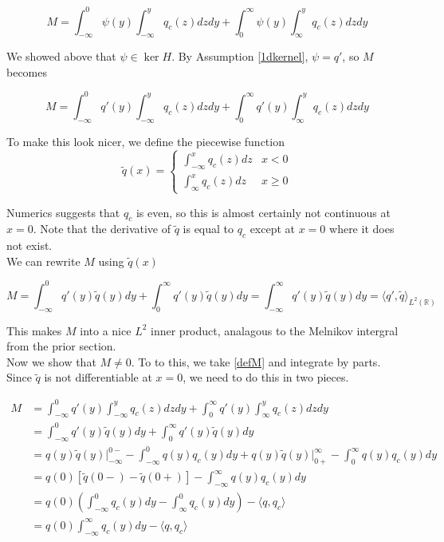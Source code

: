 \documentclass[12pt]{article}
\def\R{{\mathbb R}}
\begin{document}
\begin{equation}
M = \int_{-\infty}^0 \psi(y) \int_{-\infty}^y q_c(z) dz dy + \int_0^\infty \psi(y) \int_{\infty}^y q_c(z) dz dy 
\end{equation}

We showed above that $\psi \in \ker H$. By Assumption \ref{1dkernel}, $\psi = q'$, so $M$ becomes

\begin{equation}\label{defM}
M = \int_{-\infty}^0 q'(y) \int_{-\infty}^y q_c(z) dz dy + \int_0^\infty q'(y) \int_{\infty}^y q_c(z) dz dy
\end{equation}

To make this look nicer, we define the piecewise function
\[
\tilde{q}(x) = \begin{cases}
\int_{-\infty}^x q_c(z) dz & x < 0 \\
\int_{\infty}^x q_c(z) dz & x \geq 0
\end{cases}
\]

Numerics suggests that $q_c$ is even, so this is almost certainly not continuous at $x = 0$. Note that the derivative of $\tilde{q}$ is equal to $q_c$ except at $x = 0$ where it does not exist.\\

We can rewrite $M$ using $\tilde{q}(x)$

\[
M = \int_{-\infty}^0 q'(y) \tilde{q}(y) dy + \int_0^\infty q'(y) \tilde{q}(y) dy = \int_{-\infty}^\infty q'(y) \tilde{q}(y) dy = \langle q', \tilde{q} \rangle_{L^2(\R)}
\]

This makes $M$ into a nice $L^2$ inner product, analagous to the Melnikov intergral from the prior section.\\

Now we show that $M \neq 0$. To to this, we take \eqref{defM} and integrate by parts. Since $\tilde{q}$ is not differentiable at $x = 0$, we need to do this in two pieces.

\begin{align*}
M &= \int_{-\infty}^0 q'(y) \int_{-\infty}^y q_c(z) dz dy + \int_0^\infty q'(y) \int_{\infty}^y q_c(z) dz dy \\
&= \int_{-\infty}^0 q'(y) \tilde{q}(y) dy + \int_0^\infty q'(y) \tilde{q}(y) dy \\
&= q(y) \tilde{q}(y)\Big|_{-\infty}^{0-} - \int_{-\infty}^0 q(y) q_c (y) dy + q(y) \tilde{q}(y)\Big|_{0+}^{\infty} - \int_0^{\infty} q(y) q_c (y) dy \\
&= q(0)[\tilde{q}(0-) - \tilde{q}(0+)] - \int_{-\infty}^\infty q(y) q_c(y) dy \\
&= q(0)\left( \int_{-\infty}^0 q_c(y) dy - \int_{\infty}^0 q_c(y) dy \right) - \langle q, q_c \rangle \\
&= q(0) \int_{-\infty}^\infty q_c(y) dy - \langle q, q_c \rangle
\end{align*}
\end{document}
